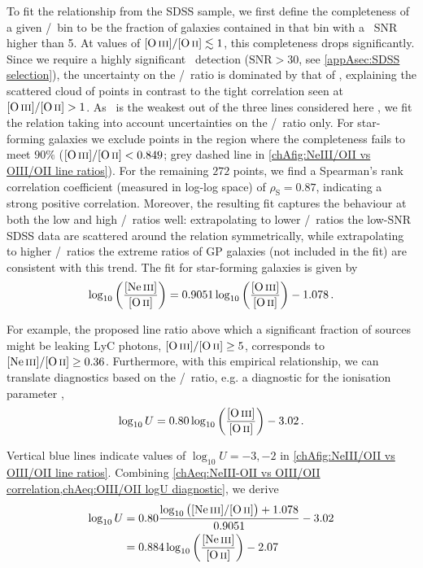 To fit the relationship from the SDSS sample, we first define the completeness of a given \OIIIf/\OII\ bin to be the fraction of galaxies contained in that bin with a \NeIII\ SNR higher than 5. At values of $\OIIIf/\OII \lesssim 1$, this completeness drops significantly. Since we require a highly significant \OII\ detection ($\text{SNR} > 30$, see \cref{appAsec:SDSS selection}), the uncertainty on the \NeIII/\OII\ ratio is dominated by that of \NeIII, explaining the scattered cloud of points in contrast to the tight correlation seen at $\OIIIf/\OII > 1$. As \NeIII\ is the weakest out of the three lines considered here , we fit the relation taking into account uncertainties on the \NeIII/\OII\ ratio only. For star-forming galaxies we exclude points in the region where the completeness fails to meet $90\%$ ($\OIIIf/\OII < 0.849$; grey dashed line in \cref{chAfig:NeIII/OII vs OIII/OII line ratios}). For the remaining $272$ points, we find a Spearman's rank correlation coefficient (measured in log-log space) of $\rho_\text{S} = 0.87$, indicating a strong positive correlation. Moreover, the resulting fit captures the behaviour at both the low and high \OIIIf/\OII\ ratios well: extrapolating to lower \OIIIf/\OII\ ratios the low-SNR SDSS data are scattered around the relation symmetrically, while extrapolating to higher \OIIIf/\OII\ ratios the extreme ratios of GP galaxies (not included in the fit) are consistent with this trend. The fit for star-forming galaxies is given by
\begin{equation}
    \label{chAeq:NeIII-OII vs OIII/OII correlation}
    \log_{10} \left( \frac{\NeIII}{\OII} \right) = 0.9051 \log_{10} \left( \frac{\OIIIf}{\OII} \right) - 1.078 \, .
\end{equation}

For example, the proposed line ratio above which a significant fraction of sources might be leaking LyC photons, $\OIIIf/\OII \geq 5$, \citep[e.g.][]{2016Natur.529..178I, 2016MNRAS.461.3683I} corresponds to $\NeIII/\OII \geq 0.36$. Furthermore, with this empirical relationship, we can translate diagnostics based on the \OIIIf/\OII\ ratio, e.g. a diagnostic for the ionisation parameter \citep[derived from single-star photoionisation models, see][]{2000MNRAS.318..462D},
\begin{equation}
    \label{chAeq:OIII/OII logU diagnostic}
    \log_{10} U = 0.80 \log_{10} \left( \frac{\OIIIf}{\OII} \right) - 3.02 \, .
\end{equation}

Vertical blue lines indicate values of $\log_{10} U = -3, -2$ in \cref{chAfig:NeIII/OII vs OIII/OII line ratios}. Combining \cref{chAeq:NeIII-OII vs OIII/OII correlation,chAeq:OIII/OII logU diagnostic}, we derive
\begin{align}
    \label{chAeq:NeIII/OII logU diagnostic}
    \log_{10} U & = 0.80 \frac{\log_{10} \left( \NeIII/\OII \right) + 1.078}{0.9051} - 3.02 \nonumber
    \\
    & = 0.884 \log_{10} \left( \frac{\NeIII}{\OII} \right) - 2.07
\end{align}

